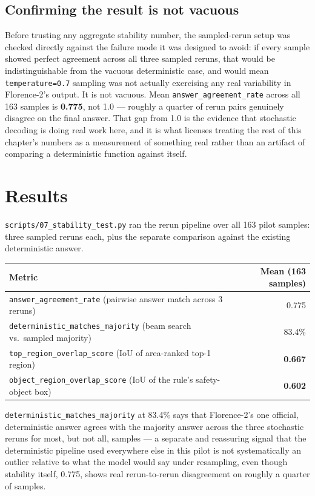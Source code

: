 \subsection{Confirming the result is not vacuous}

Before trusting any aggregate stability number, the sampled-rerun setup was checked directly
against the failure mode it was designed to avoid: if every sample showed perfect agreement across
all three sampled reruns, that would be indistinguishable from the vacuous deterministic case, and
would mean \texttt{temperature=0.7} sampling was not actually exercising any real variability in
Florence-2's output. It is not vacuous. Mean \texttt{answer\_agreement\_rate} across all 163
samples is \textbf{0.775}, not 1.0 --- roughly a quarter of rerun pairs genuinely disagree on the
final answer. That gap from 1.0 is the evidence that stochastic decoding is doing real work here,
and it is what licenses treating the rest of this chapter's numbers as a measurement of something
real rather than an artifact of comparing a deterministic function against itself.

\section{Results}

\texttt{scripts/07\_stability\_test.py} ran the rerun pipeline over all 163 pilot samples: three
sampled reruns each, plus the separate comparison against the existing deterministic answer.

\begin{center}
\begin{tabular}{lr}
\toprule
\textbf{Metric} & \textbf{Mean (163 samples)} \\
\midrule
\texttt{answer\_agreement\_rate} (pairwise answer match across 3 reruns) & 0.775 \\
\texttt{deterministic\_matches\_majority} (beam search vs.\ sampled majority) & 83.4\% \\
\texttt{top\_region\_overlap\_score} (IoU of area-ranked top-1 region) & \textbf{0.667} \\
\texttt{object\_region\_overlap\_score} (IoU of the rule's safety-object box) & \textbf{0.602} \\
\bottomrule
\end{tabular}
\end{center}

\texttt{deterministic\_matches\_majority} at 83.4\% says that Florence-2's one official,
deterministic answer agrees with the majority answer across the three stochastic reruns for most,
but not all, samples --- a separate and reassuring signal that the deterministic pipeline used
everywhere else in this pilot is not systematically an outlier relative to what the model would say
under resampling, even though stability itself, 0.775, shows real rerun-to-rerun disagreement on
roughly a quarter of samples.

